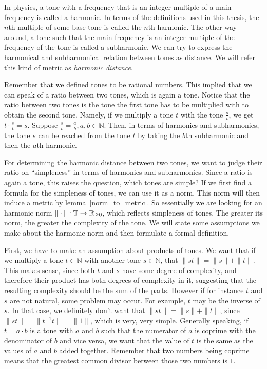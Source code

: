 \documentclass[a4paper]{book}
\theoremstyle{definition}
\begin{document}
In physics, a tone with a frequency that is an integer multiple of a main frequency is called a harmonic.
In terms of the definitions used in this thesis, the $n$th multiple of some base tone is called the $n$th harmonic.
The other way around, a tone such that the main frequency is an integer multiple of the frequency of the tone is called a subharmonic.
We can try to express the harmonical and subharmonical relation between tones as distance.
We will refer this kind of metric as \emph{harmonic distance}.

Remember that we defined tones to be rational numbers.
This implied that we can speak of a ratio between two tones, which is again a tone.
Notice that the ratio between two tones is the tone the first tone has to be multiplied with to obtain the second tone.
Namely, if we multiply a tone $t$ with the tone $\frac{s}{t}$, we get $t \cdot \frac{s}{t} = s$.
Suppose $\frac{s}{t} = \frac{a}{b}, a,b \in \mathbb{N}$.
Then, in terms of harmonics and subharmonics, the tone $s$ can be reached from the tone $t$ by taking the $b$th subharmonic and then the $a$th harmonic.

For determining the harmonic distance between two tones, we want to judge their ratio on ``simpleness'' in terms of harmonics and subharmonics.
Since a ratio is again a tone, this raises the question, which tones are simple?
If we first find a formula for the simpleness of tones, we can use it as a norm.
This norm will then induce a metric by lemma~\ref{norm_to_metric}.
So essentially we are looking for an harmonic norm $\| \cdot \| : \mathbb{T} \to \mathbb{R}_{\geq 0}$, which reflects simpleness of tones.
The greater its norm, the greater the complexity of the tone.
We will state some assumptions we make about the harmonic norm and then formulate a formal definition.

First, we have to make an assumption about products of tones.
We want that if we multiply a tone $t \in \mathbb{N}$ with another tone $s \in \mathbb{N}$, that $\|st\| = \|s\|+\|t\|$.
This makes sense, since both $t$ and $s$ have some degree of complexity, and therefore their product has both degrees of complexity in it, suggesting that the resulting complexity should be the sum of the parts.
However if for instance $t$ and $s$ are not natural, some problem may occur.
For example, $t$ may be the inverse of $s$.
In that case, we definitely don't want that $\|st\| = \|s\|+\|t\|$, since $\|st\|=\|t^{-1}t\|=\|1\|$, which is very, very simple.
Generally speaking, if $t = a \cdot b$ is a tone with $a$ and $b$ such that the numerator of $a$ is coprime with the denominator of $b$ and vice versa, we want that the value of $t$ is the same as the values of $a$ and $b$ added together.
Remember that two numbers being coprime means that the greatest common divisor between those two numbers is $1$.
\end{document}
